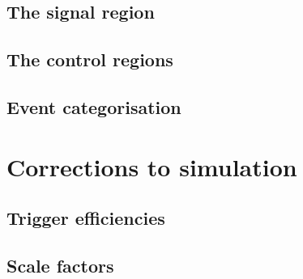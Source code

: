 \subsection{The signal region}

\subsection{The control regions}

\subsection{Event categorisation}

\section{Corrections to simulation}

\subsection{Trigger efficiencies}

\subsection{Scale factors}

